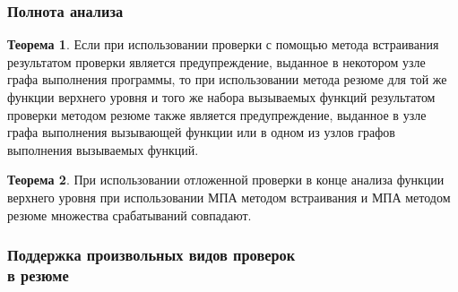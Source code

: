\documentclass[hyperref={pdfpagelabels=false},10pt]{beamer}
\begin{document}

\begin{frame}
\frametitle{Полнота анализа}
\textbf{Теорема 1}. Если при использовании проверки с помощью метода встраивания результатом проверки является предупреждение, выданное в некотором узле графа выполнения программы, то при использовании метода резюме для той же функции верхнего уровня и того же набора вызываемых функций результатом проверки методом резюме также является предупреждение, выданное в узле графа выполнения вызывающей функции или в одном из узлов графов выполнения вызываемых функций.

\vspace{10pt}
\textbf{Теорема 2}. При использовании отложенной проверки в конце анализа функции верхнего уровня при использовании МПА методом встраивания и МПА методом резюме множества срабатываний совпадают.
\end{frame}

\begin{frame}
\frametitle{Поддержка произвольных видов проверок\\в резюме}
\begin{figure}[h]
\end{figure}
\end{frame}
\end{document}
